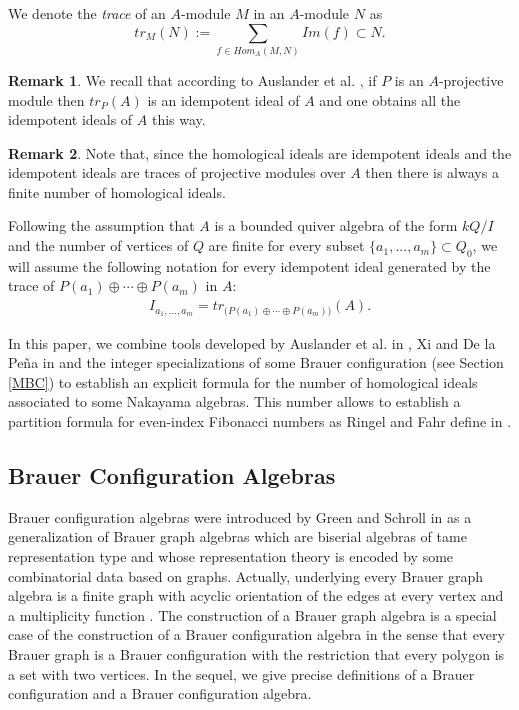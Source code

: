 \documentclass[10pt,twoside]{article}
\theoremstyle{definition}
\newtheorem{Nota}{Remark}
\begin{document}
We denote the \textit{trace} of an $A$-module $M$ in an $A$-module $N$ as
$$tr_M(N):={\displaystyle\sum_{f\in Hom_{A}(M,N)}} Im(f) \subset N.$$


\addtocounter{Nota}{1}
\begin{Nota}
We recall that according to Auslander et al. \cite{Auslander}, if $P$ is an $A$-projective module then $tr_P(A)$ is an idempotent ideal of $A$ and one obtains all the idempotent ideals of $A$ this way.  
\end{Nota}

\begin{Nota}
Note that, since the homological ideals are idempotent ideals and the idempotent ideals are traces of projective modules over $A$ then there is always a finite number of homological ideals.
\end{Nota}

Following the assumption that $A$ is a bounded quiver algebra of the form $kQ/I$ and the number of vertices of $Q$ are finite for every subset $\{a_1,...,a_m \} \subset Q_0$, we will assume the following notation for every idempotent ideal generated by the  trace of $P(a_1) \oplus \cdots \oplus P(a_m)$ in $A$:
\begin{equation}\label{HI1}
\begin{split}
I_{a_1,...,a_m} = tr_{\Big(P(a_1) \oplus \cdots \oplus P(a_m)\Big) }(A).
\end{split}
\end{equation}

In this paper, we combine  tools developed by Auslander et al. in \cite{Auslander}, Xi and De la Pe\~na in \cite{JAP} and the integer specializations of some Brauer configuration (see Section \ref{MBC}) to establish an explicit formula for the number of homological ideals associated to some Nakayama algebras. This number allows to establish a partition formula for even-index Fibonacci numbers as Ringel and Fahr define in \cite{Fahr1, Fahr2, Fahr3}.

\subsection{Brauer Configuration Algebras}

Brauer configuration algebras were introduced by Green and Schroll in \cite{Green} as a generalization of Brauer graph algebras which are biserial algebras of tame representation type and whose representation theory is encoded by some combinatorial data based on graphs. Actually, underlying every Brauer graph algebra is a finite graph with acyclic orientation of the edges at every vertex and a multiplicity function \cite{Green}.  The construction of a Brauer graph algebra is a special case of the construction of a Brauer configuration algebra in the sense that every  Brauer graph is a Brauer configuration with the restriction that every polygon is a set with two vertices. In the sequel, we give precise definitions of a Brauer configuration and a Brauer configuration algebra.\par\bigskip
\end{document}
